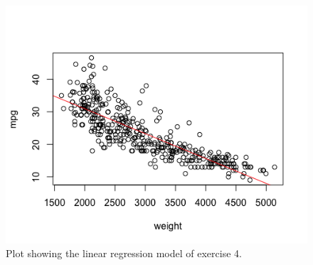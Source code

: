 \documentclass{paper}
\begin{document}
\begin{figure}
  \begin{center}
    \quad\quad
    \includegraphics[width=.8\linewidth]{ex4}
  \end{center}
  \caption{Plot showing the linear regression
   model of exercise 4.}
   \label{fig:ex4}
\end{figure}
\end{document}
